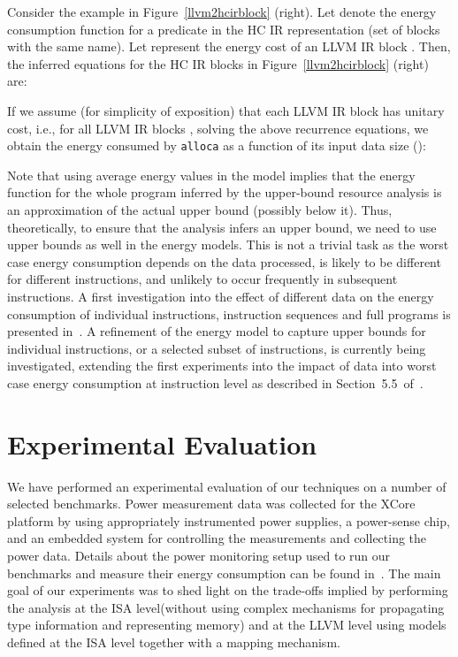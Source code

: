 \documentclass{llncs}
\newcommand{\level}{level\xspace}
\newcommand{\hcir}{HC IR\xspace}
\newcommand{\llvmir}{LLVM IR\xspace}
\newcommand{\llvm}{LLVM\xspace}
\begin{document}
Consider the example in Figure~\ref{llvm2hcirblock} (right). Let  denote
the energy consumption function for a predicate  in the \hcir
representation (set of blocks with the same name). Let  represent
the energy cost of an \llvmir block .
Then, the inferred equations for the \hcir blocks in
Figure~\ref{llvm2hcirblock} (right) are:


\vspace*{-5mm}

\vspace*{-5mm}



If we assume (for simplicity of exposition) that each \llvmir block
has unitary cost, i.e.,  for all \llvmir blocks , solving
the above recurrence equations, we obtain the energy consumed by
\texttt{alloca} as a function of its input data size ():
\begin{center}

\end{center}

Note that using average energy values in the model implies that the energy
function for the whole program inferred by the upper-bound resource
analysis is an approximation of the actual upper bound (possibly below
it).  Thus, theoretically, to ensure that the analysis infers an
upper bound, we need to use upper bounds as well in the energy models.
This is not a trivial task as the worst case energy consumption depends on the
data processed, is likely to be different for different instructions, and
unlikely to occur frequently in subsequent instructions. 
A first investigation into the effect of different data on the energy consumption of individual instructions, instruction sequences and full programs is presented in~\cite{pallister2015data}. 
A refinement of the energy model to capture upper bounds for individual
instructions, or a selected subset of instructions, is currently being
investigated, extending the first experiments into the impact of data into
worst case energy consumption at instruction level as described in
Section~5.5~of~\cite{Kerrison13}.

\section{Experimental Evaluation}
\label{sec:experiments}

We have performed an experimental evaluation of our techniques on a
number of selected benchmarks. Power measurement data was collected
for the XCore platform by using appropriately instrumented power
supplies, a power-sense chip, and an embedded system for controlling
the measurements and collecting the power data.  
Details about the power monitoring setup used to run our benchmarks
and measure their energy consumption can be found in~\cite{Kerrison13}. 
The main goal of our
experiments was to shed light on the trade-offs implied by performing
the analysis at the ISA \level (without using complex mechanisms for
propagating type information and representing memory) and at the \llvm
level using models defined at the ISA \level together with a mapping
mechanism.
\end{document}

